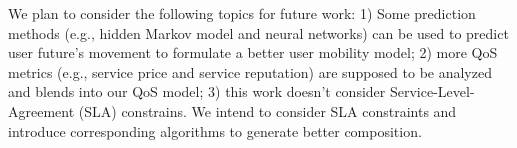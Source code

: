 \documentclass[10pt,journal,compsoc]{IEEEtran}
\begin{document}
We plan to consider the following topics for future work: 1) Some prediction methods (e.g., hidden Markov model and neural networks) can be used to predict user future's movement to formulate a better user mobility model; 2) more QoS metrics (e.g., service price and service reputation) are supposed to be analyzed and blends into our QoS model; 3) this work doesn't consider Service-Level-Agreement (SLA) constrains. We intend to consider SLA constraints and introduce corresponding algorithms to generate better composition.

​		
​	





\end{document}
